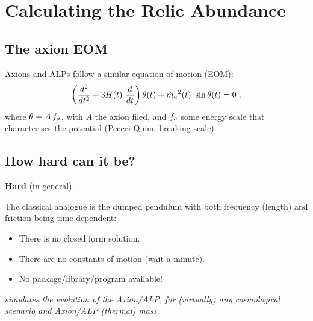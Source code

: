 \documentclass[10pt,utf8,compress,xcolor=dvipsnames]{beamer}
\begin{document}
\section{Calculating the Relic Abundance}
\subsection{The axion EOM}
\begin{frame}{\insertsubsectionhead}
	Axions and ALPs follow a similar equation of motion (EOM):
	\begin{equation*}
		\left( \dfrac{d^2}{d t^2} + 3 H(t) \ \dfrac{d}{d t}  \right) \theta(t) + \tilde m_{a}{}^2(t) \ \sin \theta(t) = 0 \; ,
	\end{equation*}	
	where $\theta= A \, f_{a}{}$, with $A$ the axion filed, and $f_{a}{}$ some energy scale that characterises the potential (Peccei-Quinn breaking scale).


\end{frame}

\subsection{How hard can it be?}
\begin{frame}{\insertsubsectionhead}
	\begin{center}
		\textbf{Hard} (in general).\\[1cm]\pause
	\end{center}	

	The classical analogue is the dumped pendulum with both frequency (length) and friction being time-dependent:
	\begin{itemize}
		\item There is no closed form solution.
		\item There are no constants of motion (wait a minute).
		\item No package/library/program available!\\[2cm]\pause
	\end{itemize}

	\begin{center}
		{\sl \mimes simulates the evolution of the Axion/ALP, for (virtually) any cosmological scenario and Axion/ALP (thermal) mass.}
	\end{center}		
\end{frame}
\end{document}
